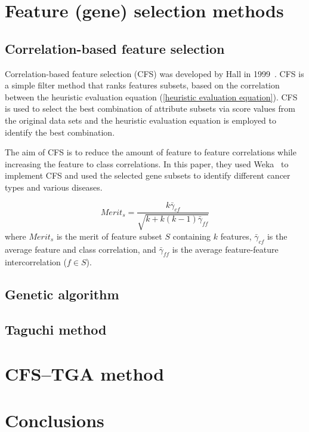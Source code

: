 \documentclass[runningheads]{llncs}
\begin{document}
\section{Feature (gene) selection methods}

\subsection{Correlation-based feature selection}\label{Correlation-based feature selection}
Correlation-based feature selection (CFS) was developed by Hall in 1999~\cite{hall1998correlation}. CFS is a simple filter method that ranks features subsets, based on the correlation between the heuristic evaluation equation (\ref{heuristic evaluation equation}). CFS is used to select the best combination of attribute subsets via score values from the original data sets and the heuristic evaluation equation is employed to identify the best combination. 

The aim of CFS is to reduce the amount of feature to feature correlations while increasing the feature to class correlations. In this paper, they used Weka~\cite{frank2004data} to implement CFS and used the selected gene subsets to identify different cancer types and various diseases.

\begin{equation}\label{heuristic evaluation equation}
	Merit_{s} = \frac{k\bar{\gamma}_{cf}}{\sqrt{k+k(k-1)\bar{\gamma}_{ff}}}
\end{equation}
where $Merit_{s}$ is the merit of feature subset $S$ containing $k$ features, $\bar{\gamma}_{cf}$ is the average feature and class correlation, and $\bar{\gamma}_{ff}$ is the average feature-feature intercorrelation ($f\in S$).

\subsection{Genetic algorithm}\label{Genetic algorithm}

\subsection{Taguchi method}

\section{CFS–TGA method}

\section{Conclusions}
\end{document}
